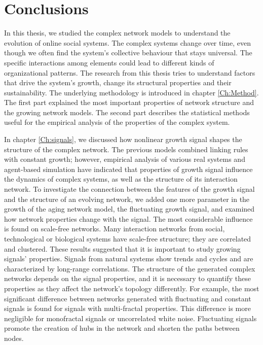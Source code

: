 \chapter{Conclusions} %
\label{Ch:Conclussion}

In this thesis, we studied the complex network models to understand the evolution of online social systems. %
The complex systems change over time, even though we often find the system's collective behaviour that stays universal. The specific interactions among elements could lead to different kinds of organizational patterns. The research from this thesis tries to understand factors that drive the system's growth, change its structural properties and their sustainability.
The underlying methodology is introduced in chapter \ref{Ch:Method}. The first part explained the most important properties of network structure and the growing network models. The second part describes the statistical methods useful for the empirical analysis of the properties of the complex system.  

In chapter \ref{Ch:signals}, we discussed how nonlinear growth signal shapes the structure of the complex network. 
The previous models combined linking rules with constant growth; however, empirical analysis of various real systems and agent-based simulation \cite{mitrovic2012, mitrovic2015} have indicated that properties of growth signal influence the dynamics of complex systems, as well as the structure of its interaction network. To investigate the connection between the features of the growth signal and the structure of an evolving network, we added one more parameter in the growth of the aging network model, the fluctuating growth signal, and examined how network properties change with the signal.
The most considerable influence is found on scale-free networks. Many interaction networks from social, technological or biological systems have scale-free structure; they are correlated and clustered. These results suggested that it is important to study growing signals' properties. Signals from natural systems show trends and cycles and are characterized by long-range correlations. The structure of the generated complex networks depends on the signal properties, and it is necessary to quantify these properties as they affect the network's topology differently. For example, the most significant difference between networks generated with fluctuating and constant signals is found for signals with multi-fractal properties. This difference is more negligible for monofractal signals or uncorrelated white noise. Fluctuating signals promote the creation of hubs in the network and shorten the paths between nodes.

